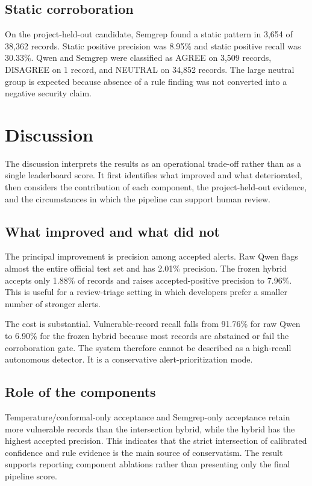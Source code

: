 \documentclass[pdflatex,sn-mathphys-num]{sn-jnl}
\begin{document}
\subsection{Static corroboration}

On the project-held-out candidate, Semgrep found a static pattern in 3,654 of 38,362 records. Static positive precision was 8.95\% and static positive recall was 30.33\%. Qwen and Semgrep were classified as AGREE on 3,509 records, DISAGREE on 1 record, and NEUTRAL on 34,852 records. The large neutral group is expected because absence of a rule finding was not converted into a negative security claim.

\section{Discussion}\label{sec:discussion}

The discussion interprets the results as an operational trade-off rather than as a single leaderboard score. It first identifies what improved and what deteriorated, then considers the contribution of each component, the project-held-out evidence, and the circumstances in which the pipeline can support human review.

\subsection{What improved and what did not}

The principal improvement is precision among accepted alerts. Raw Qwen flags almost the entire official test set and has 2.01\% precision. The frozen hybrid accepts only 1.88\% of records and raises accepted-positive precision to 7.96\%. This is useful for a review-triage setting in which developers prefer a smaller number of stronger alerts.

The cost is substantial. Vulnerable-record recall falls from 91.76\% for raw Qwen to 6.90\% for the frozen hybrid because most records are abstained or fail the corroboration gate. The system therefore cannot be described as a high-recall autonomous detector. It is a conservative alert-prioritization mode.

\subsection{Role of the components}

Temperature/conformal-only acceptance and Semgrep-only acceptance retain more vulnerable records than the intersection hybrid, while the hybrid has the highest accepted precision. This indicates that the strict intersection of calibrated confidence and rule evidence is the main source of conservatism. The result supports reporting component ablations rather than presenting only the final pipeline score.
\end{document}
